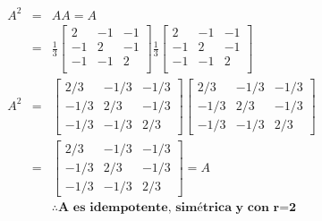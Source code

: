 \documentclass[12pt,a4paper]{report}
\begin{document}
\begin{enumerate}
		\begin{eqnarray*}
		A^{2}&=&A  A=A\\
		&=&\frac{1}{3}  \begin{bmatrix}
				2 & -1 & -1\\
				-1 & 2 & -1\\
				-1 & -1 & 2\\
			\end{bmatrix}	
			\frac{1}{3}  \begin{bmatrix}
				2 & -1 & -1\\
				-1 & 2 & -1\\
				-1 & -1 & 2\\
			\end{bmatrix}\\			
			A^{2}&=&\begin{bmatrix}
				2/3 & -1/3 & -1/3\\
				-1/3 & 2/3 & -1/3\\
				-1/3 & -1/3 & 2/3
			\end{bmatrix}	
			\begin{bmatrix}
				2/3 & -1/3 & -1/3\\
				-1/3 & 2/3 & -1/3\\
				-1/3 & -1/3 & 2/3
			\end{bmatrix}\\
			&=&\begin{bmatrix}
				2/3 & -1/3 & -1/3\\
				-1/3 & 2/3 & -1/3\\
				-1/3 & -1/3 & 2/3
			\end{bmatrix}=A	\\						&&\therefore 	\textbf{A es idempotente, simétrica y con r=2}
		\end{eqnarray*}



\end{enumerate}
\end{document}
